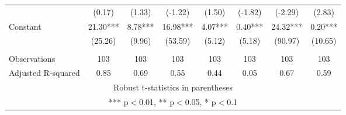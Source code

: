 \documentclass[]{article}
\begin{document}
\begin{tabular}{lccccccc}
 & (0.17) & (1.33) & (-1.22) & (1.50) & (-1.82) & (-2.29) & (2.83) \\
Constant & 21.30*** & 8.78*** & 16.98*** & 4.07*** & 0.40*** & 24.32*** & 0.20*** \\
 & (25.26) & (9.96) & (53.59) & (5.12) & (5.18) & (90.97) & (10.65) \\
 &  &  &  &  &  &  &  \\
Observations & 103 & 103 & 103 & 103 & 103 & 103 & 103 \\
 Adjusted R-squared & 0.85 & 0.69 & 0.55 & 0.44 & 0.05 & 0.67 & 0.59 \\ \hline
\multicolumn{8}{c}{ Robust t-statistics in parentheses} \\
\multicolumn{8}{c}{ *** p$<$0.01, ** p$<$0.05, * p$<$0.1} \\
\end{tabular}
\end{document}
